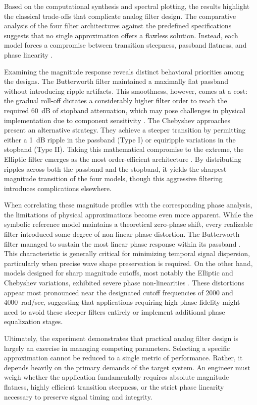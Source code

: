 Based on the computational synthesis and spectral plotting, the results highlight the classical trade-offs that complicate analog filter design. The comparative analysis of the four filter architectures against the predefined specifications suggests that no single approximation offers a flawless solution. Instead, each model forces a compromise between transition steepness, passband flatness, and phase linearity \cite{oppenheim1997}.

Examining the magnitude response reveals distinct behavioral priorities among the designs. The Butterworth filter maintained a maximally flat passband without introducing ripple artifacts. This smoothness, however, comes at a cost: the gradual roll-off dictates a considerably higher filter order to reach the required 60~dB of stopband attenuation, which may pose challenges in physical implementation due to component sensitivity \cite{haykin1999}. The Chebyshev approaches present an alternative strategy. They achieve a steeper transition by permitting either a 1~dB ripple in the passband (Type I) or equiripple variations in the stopband (Type II). Taking this mathematical compromise to the extreme, the Elliptic filter emerges as the most order-efficient architecture \cite{riskin2003}. By distributing ripples across both the passband and the stopband, it yields the sharpest magnitude transition of the four models, though this aggressive filtering introduces complications elsewhere.

When correlating these magnitude profiles with the corresponding phase analysis, the limitations of physical approximations become even more apparent. While the symbolic reference model maintains a theoretical zero-phase shift, every realizable filter introduced some degree of non-linear phase distortion. The Butterworth filter managed to sustain the most linear phase response within its passband \cite{oppenheim1997}. This characteristic is generally critical for minimizing temporal signal dispersion, particularly when precise wave shape preservation is required. On the other hand, models designed for sharp magnitude cutoffs, most notably the Elliptic and Chebyshev variations, exhibited severe phase non-linearities \cite{hsu2013}. These distortions appear most pronounced near the designated cutoff frequencies of 2000 and 4000~rad/sec, suggesting that applications requiring high phase fidelity might need to avoid these steeper filters entirely or implement additional phase equalization stages.

Ultimately, the experiment demonstrates that practical analog filter design is largely an exercise in managing competing parameters. Selecting a specific approximation cannot be reduced to a single metric of performance. Rather, it depends heavily on the primary demands of the target system. An engineer must weigh whether the application fundamentally requires absolute magnitude flatness, highly efficient transition steepness, or the strict phase linearity necessary to preserve signal timing and integrity.